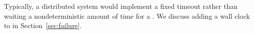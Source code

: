 Typically, a distributed system would implement a fixed timeout rather than waiting a nondeterministic amount of time for a .  We discuss adding a wall clock to \lang in Section~\ref{sec:failure}.

%
%
